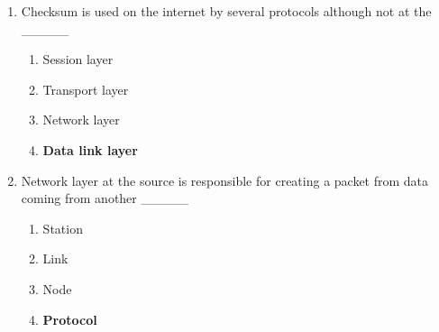 \documentclass{article}
\begin{document}
\begin{enumerate}[label=\arabic*.]
    \item Checksum is used on the internet by several protocols although not at the \_\_\_\_\_
          \begin{enumerate}
              \item Session layer
              \item Transport layer
              \item Network layer
              \item \textbf{Data link layer}
          \end{enumerate}

    \item Network layer at the source is responsible for creating a packet from data coming from another \_\_\_\_\_
          \begin{enumerate}
              \item Station
              \item Link
              \item Node
              \item \textbf{Protocol}
          \end{enumerate}

\end{enumerate}
\end{document}

